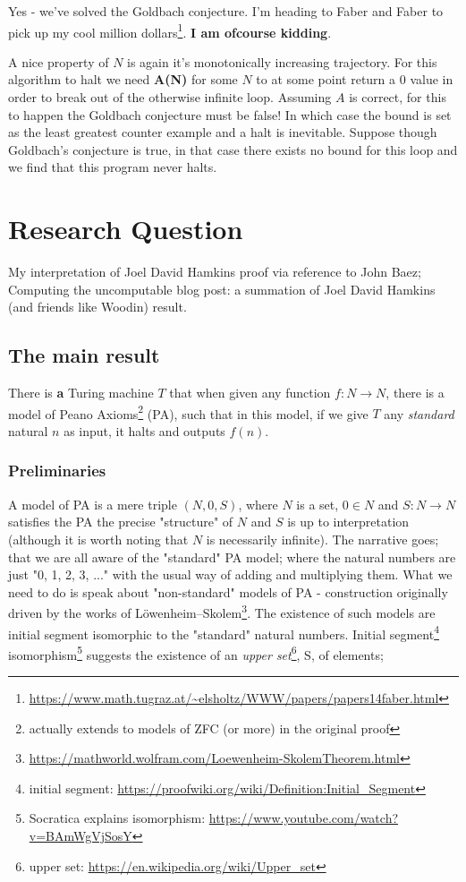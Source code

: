 \documentclass{article}
\begin{document}
Yes - we've solved the Goldbach conjecture. I'm heading to Faber and Faber to pick up my cool million dollars\footnote{\url{https://www.math.tugraz.at/~elsholtz/WWW/papers/papers14faber.html}}. \textbf{I am ofcourse kidding}. 

A nice property of $N$ is again it's monotonically increasing trajectory. For this algorithm to halt we need \textbf{A(N)} for some $N$ to at some point return a $0$ value in order to break out of the otherwise infinite loop. Assuming $A$ is correct, for this to happen the Goldbach conjecture must be false! In which case the bound is set as the least greatest counter example and a halt is inevitable. Suppose though Goldbach's conjecture is true, in that case there exists no bound for this loop and we find that this program never halts.

\pagebreak
\section{Research Question}
My interpretation of Joel David Hamkins proof via reference to John Baez; Computing the uncomputable blog post: a summation of Joel David Hamkins (and friends like Woodin) result.

\subsection{The main result}
There is \textbf{a} Turing machine $T$ that when given any function $f: N \rightarrow N$, there is a model of Peano Axioms\footnote{actually extends to models of ZFC (or more) in the original proof} (PA), such that in this model, if we give $T$ any \emph{standard} natural $n$ as input, it halts and outputs $f(n)$.

\subsubsection{Preliminaries}
A model of PA is a mere triple $(N, 0, S)$, where $N$ is a set, $0 \in N$ and $S: N \rightarrow N$ satisfies the PA the precise "structure" of $N$ and $S$ is up to interpretation (although it is worth noting that $N$ is necessarily infinite). The narrative goes; that we are all aware of the "standard" PA model; where the natural numbers are just "0, 1, 2, 3, ..." with the usual way of adding and multiplying them. What we need to do is speak about "non-standard" models of PA - construction originally driven by the works of Löwenheim–Skolem\footnote{\url{https://mathworld.wolfram.com/Loewenheim-SkolemTheorem.html}}. The existence of such models are initial segment isomorphic to the "standard" natural numbers. Initial segment\footnote{initial segment: \url{https://proofwiki.org/wiki/Definition:Initial_Segment}} isomorphism\footnote{Socratica explains isomorphism: \url{https://www.youtube.com/watch?v=BAmWgVjSosY}} suggests the existence of an \emph{upper set}\footnote{upper set: \url{https://en.wikipedia.org/wiki/Upper_set}}, S, of elements;
\end{document}
